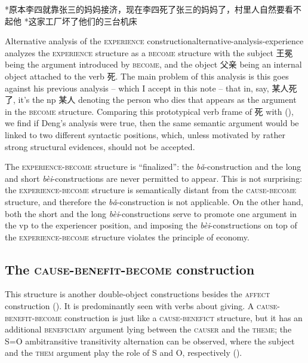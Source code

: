\documentclass[UTF8, a4paper, oneside, scheme=plain, 12pt]{ctexrep}
\newcommand*{\citesec}[1]{\S~{#1}}
\newcommand{\form}[1]{\emph{#1}}
\newcommand*{\category}[1]{\textsc{#1}}
\begin{document}
\begin{exe}
    \ex\label{ex:verb-phrase.experience.3} *原本李四就靠张三的妈妈接济，现在李四死了张三的妈妈了，村里人自然要看不起他
    \ex\label{ex:verb-phrase.experience-4} *这家工厂坏了他们的三台机床
\end{exe}

\begin{infobox}{Alternative analysis of the \category{experience} construction}{alternative-analysis-experience}
    \citet[\citesec{212}]{deng2010formal} analyzes the \category{experience} structure 
    as a \category{become} structure with 
    the subject 王冕 being the argument introduced by \category{become},
    and the object 父亲 being an internal object attached to the verb 死.
    The main problem of this analysis is 
    this goes against his previous analysis -- 
    which I accept in this note -- 
    that in, say, 某人死了, it's the \acs{np} 某人 denoting the person who dies that 
    appears as the argument in the \category{become} structure.
    Comparing this prototypical verb frame of 死 
    with (),
    we find if Deng's analysis were true,
    then the same semantic argument would be linked to two different syntactic positions,
    which, unless motivated by rather strong structural evidences, 
    should not be accepted.
\end{infobox}

The \category{experience}-\category{become} structure is ``finalized'':
the \form{bǎ}-construction and the long and short \form{bèi}-constructions
are never permitted to appear.
This is not surprising:
the \category{experience}-\category{become} structure 
is semantically distant from the \category{cause}-\category{become} structure,
and therefore the \form{bǎ}-construction 
is not applicable.
On the other hand,
both the short and the long \form{bèi}-constructions 
serve to promote one argument in the \acs{vp} 
to the experiencer position,
and imposing the \form{bèi}-constructions 
on top of the \category{experience}-\category{become} structure
violates the principle of economy.

\subsection{The \category{cause}-\category{benefit}-\category{become} construction}
\label{sec:verb-phrase.dative}

This structure is another double-object constructions 
besides the \category{affect} construction
().
It is predominantly seen with verbs about giving.
A \category{cause}-\category{benefit}-\category{become} construction
is just like a \category{cause}-\category{benefict} structure,
but it has an additional \category{beneficiary} argument 
lying between the \category{causer} and the \category{theme};
the S=O ambitransitive transitivity alternation 
can be observed, 
where the subject and the \category{them} argument 
play the role of S and O, respectively 
().
\end{document}
